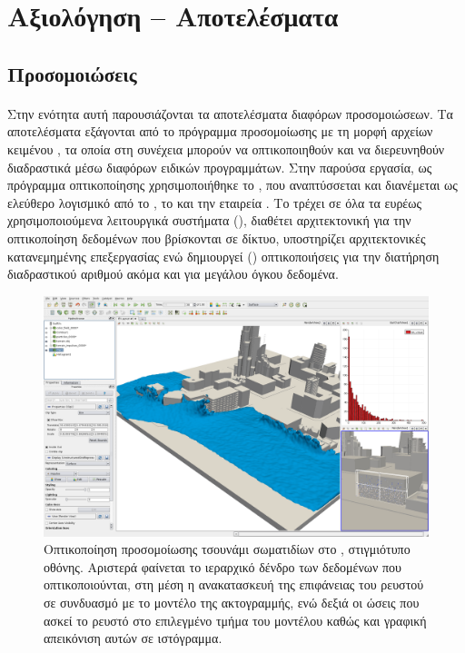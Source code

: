 \section{Αξιολόγηση -- Αποτελέσματα}

\subsection{Προσομοιώσεις}
\label{ssec:simulations}
\paragraph{} Στην ενότητα αυτή παρουσιάζονται τα αποτελέσματα διαφόρων προσομοιώσεων. Τα
αποτελέσματα εξάγονται από το πρόγραμμα προσομοίωσης με τη μορφή αρχείων κειμένου
, τα οποία στη συνέχεια μπορούν να οπτικοποιηθούν και να διερευνηθούν διαδραστικά
μέσω διαφόρων ειδικών προγραμμάτων. Στην παρούσα εργασία, ως πρόγραμμα οπτικοποίησης
χρησιμοποιήθηκε το , που αναπτύσσεται και διανέμεται ως ελεύθερο λογισμικό
από το , το  και την
εταιρεία . Το  τρέχει σε όλα τα ευρέως χρησιμοποιούμενα
λειτουργικά συστήματα (), διαθέτει αρχιτεκτονική
 για την οπτικοποίηση δεδομένων που βρίσκονται σε δίκτυο, υποστηρίζει
αρχιτεκτονικές κατανεμημένης επεξεργασίας ενώ δημιουργεί  ()
οπτικοποιήσεις για την διατήρηση διαδραστικού αριθμού  ακόμα και για μεγάλου
όγκου δεδομένα.

\begin{figure}
  \centering
  \includegraphics[width=\textwidth]{figures/paraview-interface.png}
  \caption[Οπτικοποίηση προσομοίωσης] {Οπτικοποίηση προσομοίωσης τσουνάμι 
    σωματιδίων στο , στιγμιότυπο οθόνης. Αριστερά φαίνεται το ιεραρχικό
    δένδρο των δεδομένων που οπτικοποιούνται, στη μέση η ανακατασκευή της επιφάνειας του
    ρευστού σε συνδυασμό με το μοντέλο της ακτογραμμής, ενώ δεξιά οι ώσεις που ασκεί το
    ρευστό στο επιλεγμένο τμήμα του μοντέλου καθώς και γραφική απεικόνιση αυτών σε
    ιστόγραμμα.}
  \label{fig:paraview-interface}
\end{figure}

